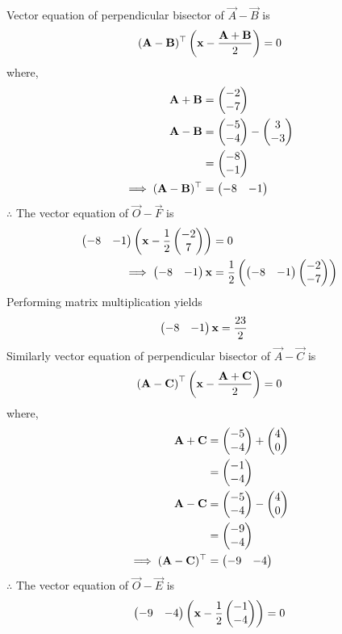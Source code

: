 \documentclass[10pt]{book}
\begin{document}
\begin{enumerate}[label=\thesection.\arabic*.,ref=\thesection.\theenumi]
Vector equation of perpendicular bisector of $\vec{A}-\vec{B}$ is
\begin{align}
 (\mathbf{A}-\mathbf{B})^\top  \left( \mathbf{x} - \frac{\mathbf{A}+\mathbf{B}}{2}\right) = 0
\end{align}
where,
\begin{align}
\mathbf{A}+\mathbf{B}&=\begin{pmatrix}-2\\ -7\end{pmatrix}\\
\mathbf{A}-\mathbf{B} &= \begin{pmatrix}-5\\-4\end{pmatrix}-\begin{pmatrix}3\\-3\end{pmatrix}\\
&=\begin{pmatrix}-8\\-1\end{pmatrix}\\
\implies (\mathbf{A}-\mathbf{B})^\top &= \begin{pmatrix}-8 &-1\end{pmatrix}
\end{align}
$\therefore $ The vector equation of $\vec{O}-\vec{F}$ is
\begin{align}
\begin{pmatrix}-8 & -1\end{pmatrix} \left(\mathbf{x}-\frac{1}{2}\begin{pmatrix}-2\\7\end{pmatrix}\right) &=0 \\
\implies \begin{pmatrix}-8&-1\end{pmatrix}\mathbf{x}&=\frac{1}{2}\left(\begin{pmatrix}-8 & -1\end{pmatrix}\begin{pmatrix}-2\\-7\end{pmatrix}\right)
\end{align}
Performing matrix multiplication yields
\begin{align}
\myvec{-8 & -1}\vec{x}&=\frac{23}{2}
\label{eq:vec-OF}
\end{align}
Similarly vector equation of perpendicular bisector of $\vec{A}-\vec{C}$ is
\begin{align}
\left(\mathbf{A}-\mathbf{C}\right)^\top\left(\mathbf{x} - \frac{\mathbf{A}+\mathbf{C}}{2}\right)=0
\end{align}
where,
\begin{align}
\mathbf{A}+\mathbf{C}&=\begin{pmatrix}-5\\-4\end{pmatrix}+\begin{pmatrix}4\\0\end{pmatrix}\\
&=\begin{pmatrix}-1\\-4\end{pmatrix}\\
\mathbf{A}-\mathbf{C} &= \begin{pmatrix}-5\\-4\end{pmatrix}-\begin{pmatrix}4\\0\end{pmatrix}\\
&=\begin{pmatrix}-9\\-4\end{pmatrix}\\
\implies (\mathbf{A}-\mathbf{C})^\top &= \begin{pmatrix}-9 &-4\end{pmatrix}
\end{align}
$\therefore $ The vector equation of $\vec{O}-\vec{E}$ is
\begin{align}
\myvec{-9&-4}\brak{ \vec{x}-\frac{1}{2}\myvec{-1\\-4}}&=0\\

\end{align}
\end{enumerate}
\end{document}
